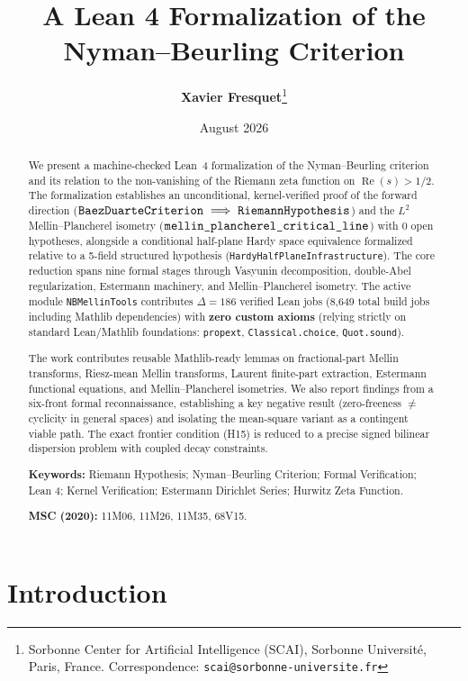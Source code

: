 \documentclass[11pt,a4paper]{article}
\title{\textbf{A Lean 4 Formalization of the Nyman--Beurling Criterion}}
\author{\textbf{Xavier Fresquet}\thanks{Sorbonne Center for Artificial Intelligence (SCAI), Sorbonne Universit\'e, Paris, France. Correspondence: \texttt{scai@sorbonne-universite.fr}}}
\date{August 2026}
\theoremstyle{plain}
\theoremstyle{definition}
\theoremstyle{remark}
\DeclareMathOperator{\RePart}{Re}
\renewcommand{\Re}{\RePart}
\begin{document}
\maketitle

\begin{abstract}
We present a machine-checked Lean~4 formalization of the Nyman--Beurling criterion and its relation to the non-vanishing of the Riemann zeta function on $\Re(s) > 1/2$. The formalization establishes an unconditional, kernel-verified proof of the forward direction ($\text{\texttt{BaezDuarteCriterion}} \implies \text{\texttt{RiemannHypothesis}}$) and the $L^2$ Mellin--Plancherel isometry ($\text{\texttt{mellin\_plancherel\_critical\_line}}$) with 0 open hypotheses, alongside a conditional half-plane Hardy space equivalence formalized relative to a 5-field structured hypothesis (\texttt{HardyHalfPlaneInfrastructure}). The core reduction spans nine formal stages through Vasyunin decomposition, double-Abel regularization, Estermann machinery, and Mellin--Plancherel isometry. The active module \texttt{NBMellinTools} contributes $\Delta = 186$ verified Lean jobs (8,649 total build jobs including Mathlib dependencies) with \textbf{zero custom axioms} (relying strictly on standard Lean/Mathlib foundations: \texttt{propext}, \texttt{Classical.choice}, \texttt{Quot.sound}). 

The work contributes reusable Mathlib-ready lemmas on fractional-part Mellin transforms, Riesz-mean Mellin transforms, Laurent finite-part extraction, Estermann functional equations, and Mellin--Plancherel isometries. We also report findings from a six-front formal reconnaissance, establishing a key negative result (zero-freeness $\ne$ cyclicity in general spaces) and isolating the mean-square variant as a contingent viable path. The exact frontier condition (H15) is reduced to a precise signed bilinear dispersion problem with coupled decay constraints.

\textbf{Keywords:} Riemann Hypothesis; Nyman--Beurling Criterion; Formal Verification; Lean 4; Kernel Verification; Estermann Dirichlet Series; Hurwitz Zeta Function.

\textbf{MSC (2020):} 11M06, 11M26, 11M35, 68V15.
\end{abstract}

\section{Introduction}
\label{sec:intro}
\end{document}
